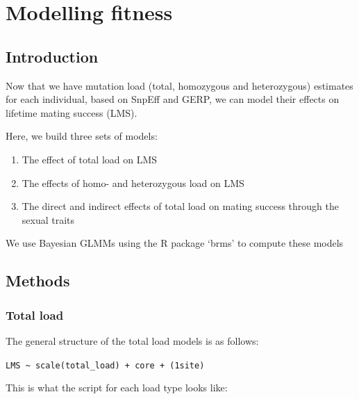 \documentclass[
  letterpaper,
  DIV=11,
  numbers=noendperiod]{scrreprt}
\providecommand{\tightlist}{%
  \setlength{\itemsep}{0pt}\setlength{\parskip}{0pt}}\usepackage{longtable,booktabs,array}
\begin{document}

\hypertarget{modelling-fitness}{%
\chapter{Modelling fitness}\label{modelling-fitness}}

\hypertarget{introduction-4}{%
\section{Introduction}\label{introduction-4}}

Now that we have mutation load (total, homozygous and heterozygous)
estimates for each individual, based on SnpEff and GERP, we can model
their effects on lifetime mating success (LMS).

Here, we build three sets of models:

\begin{enumerate}
\def\labelenumi{\arabic{enumi}.}
\tightlist
\item
  The effect of total load on LMS
\item
  The effects of homo- and heterozygous load on LMS
\item
  The direct and indirect effects of total load on mating success
  through the sexual traits
\end{enumerate}

We use Bayesian GLMMs using the R package `brms' to compute these models

\hypertarget{methods-2}{%
\section{Methods}\label{methods-2}}

\hypertarget{total-load}{%
\subsection{Total load}\label{total-load}}

The general structure of the total load models is as follows:

\texttt{LMS\ \textasciitilde{}\ scale(total\_load)\ +\ core\ +\ (1\textbar{}site)}

This is what the script for each load type looks like:
\end{document}
